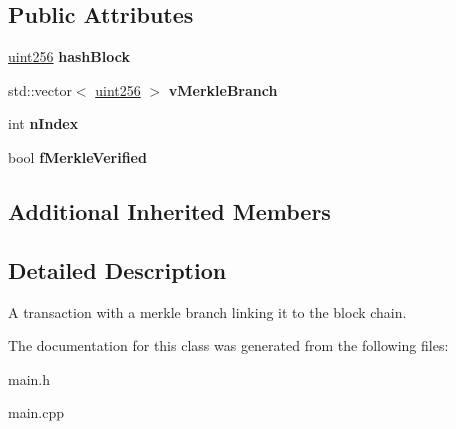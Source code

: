 \subsection*{Public Attributes}
\begin{DoxyCompactItemize}
\item 
\mbox{\label{class_c_merkle_tx_a788ee54c14b6d9706eb3737404663238}} 
\mbox{\hyperlink{classuint256}{uint256}} {\bfseries hash\+Block}
\item 
\mbox{\label{class_c_merkle_tx_a9ae6a408be914f486ebbb4161879ee69}} 
std\+::vector$<$ \mbox{\hyperlink{classuint256}{uint256}} $>$ {\bfseries v\+Merkle\+Branch}
\item 
\mbox{\label{class_c_merkle_tx_a829655e70702fdf97b6e534dd3227b0b}} 
int {\bfseries n\+Index}
\item 
\mbox{\label{class_c_merkle_tx_a3626572f7dbb86eb1c36a6570d740c7f}} 
bool {\bfseries f\+Merkle\+Verified}
\end{DoxyCompactItemize}
\subsection*{Additional Inherited Members}


\subsection{Detailed Description}
A transaction with a merkle branch linking it to the block chain. 

The documentation for this class was generated from the following files\+:\begin{DoxyCompactItemize}
\item 
main.\+h\item 
main.\+cpp\end{DoxyCompactItemize}
